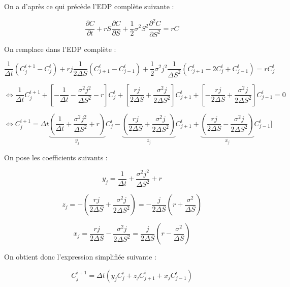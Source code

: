 \documentclass[11pt,a4paper]{article}
\begin{document}
On a d'après ce qui précède l'EDP complète suivante :

$$\frac{\partial C}{\partial t} + r S \frac{\partial C}{\partial S} + \frac{1}{2} \sigma^2 S^2 \frac{\partial^2 C}{\partial S^2} = r C$$

\vspace{0.5cm}

On remplace dans l'EDP complète :

$$ \frac{1}{\Delta t} (C_{j}^{i+1} - C_{j}^{i}) + r j \frac{1}{2\Delta S} (C_{j+1}^{i} - C_{j-1}^{i}) + \frac{1}{2} \sigma^{2} j^{2} \frac{1}{\Delta S^{2}} (C_{j+1}^{i}-2C_{j}^{i}+C_{j-1}^{i}) = r C_{j}^{i} $$

$$ \Leftrightarrow \frac{1}{\Delta t} C_{j}^{i+1} + [-\frac{1}{\Delta t} - \frac{\sigma^{2} j^{2}}{\Delta S^{2}} - r]C_{j}^{i} + [\frac{rj}{2\Delta S} + \frac{\sigma^{2}j}{2\Delta S^{2}}]C_{j+1}^{i} + [-\frac{rj}{2\Delta S} + \frac{\sigma^{2}j}{2\Delta S^{2}}]C_{j-1}^{i} = 0 $$

$$ \Leftrightarrow C_{j}^{i+1} = \Delta t \underbrace{(\frac{1}{\Delta t} + \frac{\sigma^{2} j^{2}}{\Delta S^{2}} + r)}_{y_j} C_{j}^{i} - \underbrace{(\frac{rj}{2\Delta S} + \frac{\sigma^{2}j}{2\Delta S^{2}})}_{z_j} C_{j+1}^{i} + \underbrace{(\frac{rj}{2\Delta S} - \frac{\sigma^{2}j}{2\Delta S^{2}})}_{x_j} C_{j-1}^{i}] $$

\vspace{0.5cm}

On pose les coefficients suivants :

\begin{equation}
y_{j} = \frac{1}{\Delta t} + \frac{\sigma^{2} j^{2}}{\Delta S^{2}} + r
\end{equation}

\begin{equation}
z_{j} = - (\frac{rj}{2\Delta S} + \frac{\sigma^{2}j}{2\Delta S^{2}}) = -\frac{j}{2\Delta S}(r + \frac{\sigma^{2}}{\Delta S})
\end{equation}

\begin{equation}
x_{j} = \frac{rj}{2\Delta S} - \frac{\sigma^{2}j}{2\Delta S^{2}} = \frac{j}{2\Delta S}(r - \frac{\sigma^{2}}{\Delta S})
\end{equation}

\vspace{0.5cm}

On obtient donc l'expression simplifiée suivante :

$$  C_{j}^{i+1} = \Delta t (y_{j}C_{j}^{i} + z_{j}C_{j+1}^{i} + x_{j}C_{j-1}^{i}) $$
\end{document}

